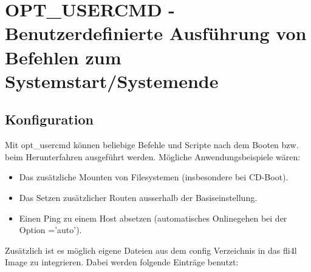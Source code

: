 {
\section {OPT\_USERCMD - Benutzerdefinierte Ausführung von Befehlen zum Systemstart/Systemende}
}

\subsection{Konfiguration}

Mit opt\_usercmd können beliebige Befehle und Scripte nach dem Booten bzw. beim Herunterfahren
ausgeführt werden. Mögliche Anwendungsbeispiele wären:

\begin{itemize}
    \item Das zusätzliche Mounten von Filesystemen (insbesondere bei CD-Boot).
    \item Das Setzen zusätzlicher Routen ausserhalb der Basiseinstellung.
    \item Einen Ping zu einem Host absetzen (automatisches Onlinegehen bei der Option ='auto').
\end{itemize}

Zusätzlich ist es möglich eigene Dateien aus dem config Verzeichnis in
das fli4l Image zu integrieren. Dabei werden folgende Einträge
benutzt:

